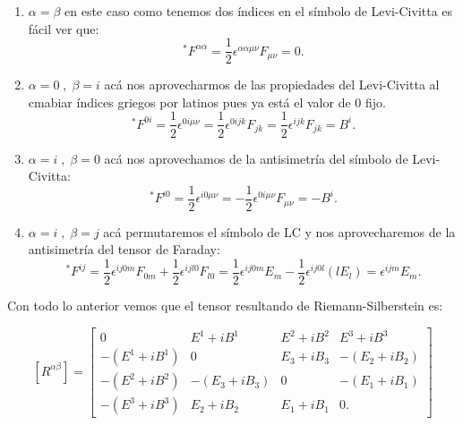         \begin{enumerate}
            \item $\alpha=\beta$ en este caso como tenemos dos índices en el símbolo de Levi-Civitta es fácil ver que:
            \begin{equation*}
                ^*F^{\alpha\alpha}=\frac{1}{2}\epsilon^{\alpha\alpha\mu\nu}F_{\mu\nu} = 0.
            \end{equation*}

            \item $\alpha = 0\;,\;\beta = i$ acá nos aprovecharmos de las propiedades del Levi-Civitta al cmabiar índices griegos por latinos pues ya está el valor de 0 fijo.
            \begin{equation*}
                ^*F^{0i}=\frac{1}{2}\epsilon^{0i\mu\nu}= \frac{1}{2}\epsilon^{0ijk}F_{jk} = \frac{1}{2}\epsilon^{ijk}F_{jk} = B^i.
            \end{equation*}

            \item $\alpha = i \;,\; \beta = 0$ acá nos aprovechamos de la antisimetría del símbolo de Levi-Civitta:
            \begin{equation*}
                ^*F^{i0} = \frac{1}{2}\epsilon^{i0\mu\nu} = - \frac{1}{2}\epsilon^{0i\mu\nu}F_{\mu\nu}=-B^i.
            \end{equation*}

            \item $\alpha = i \;,\; \beta = j$ acá permutaremos el símbolo de LC y nos aprovecharemos de la antisimetría del tensor de Faraday:
            \begin{equation*}
                ^*F^{ij}=\frac{1}{2}\epsilon^{ij0m}F_{0m} + \frac{1}{2}\epsilon^{ijl0}F_{l0} = \frac{1}{2}\epsilon^{ij0m}E_m -\frac{1}{2}\epsilon^{ij0l}(lE_l) = \epsilon^{ijm}E_m.
            \end{equation*}
        \end{enumerate}

        Con todo lo anterior vemos que el tensor resultando de Riemann-Silberstein es:

        \begin{equation}\label{eq:TensorRS}
            [R^{\alpha\beta}]=
            \begin{bmatrix}
                0 & E^1+iB^1 & E^2+iB^2 & E^3+iB^3\\
                -(E^1+iB^1) & 0 & E_3+iB_3 & -(E_2 + iB_2)\\
                -(E^2+iB^2) & -(E_3+iB_3) & 0 & -(E_1+iB_1)\\
                -(E^3+iB^3) & E_2 + iB_2 & E_1 + iB_1 & 0.
            \end{bmatrix}
        \end{equation}

